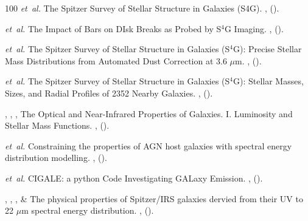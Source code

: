 \documentclass{nature2}
\begin{document}
\begin{thebibliography}{100}
\emph{et~al.}
\newblock The Spitzer Survey of Stellar Structure in Galaxies (S4G).
\newblock \emph{} \textbf{},
 ().

\emph{et~al.}
\newblock The Impact of Bars on DIsk Breaks as Probed by S\ensuremath{^{4}}G Imaging.
\newblock \emph{} \textbf{},
 ().

\emph{et~al.}
\newblock The Spitzer Survey of Stellar Structure in Galaxies (S\ensuremath{^{4}}G): Precise Stellar Mass Distributions from Automated Dust Correction at 3.6 \ensuremath{\mu}m.
\newblock \emph{} \textbf{},
 ().

\emph{et~al.}
\newblock The Spitzer Survey of Stellar Structure in Galaxies (S\ensuremath{^{4}}G): Stellar Masses, Sizes, and Radial Profiles of 2352 Nearby Galaxies.
\newblock \emph{} \textbf{},
 ().

,
, ,
\newblock The Optical and Near-Infrared Properties of Galaxies. I. Luminosity and Stellar Mass Functions.
\newblock \emph{} \textbf{},
 ().

\emph{et~al.}
\newblock Constraining the properties of AGN host galaxies with spectral energy distribution modelling.
\newblock \emph{} \textbf{},
 ().

\emph{et~al.}
\newblock CIGALE: a python Code Investigating GALaxy Emission.
\newblock \emph{} \textbf{},
 ().

,
,
,  \& 
\newblock The physical properties of Spitzer/IRS galaxies dervied from their UV to 22 \ensuremath{\mu}m spectral energy distribution.
\newblock \emph{} \textbf{},
 ().


\end{thebibliography}
\end{document}
